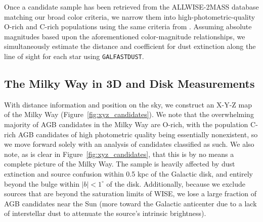 Once a candidate sample has been retrieved from the ALLWISE-2MASS database matching our broad color criteria, we narrow them into high-photometric-quality O-rich and C-rich populations using the same criteria from \cite{2014MNRAS.442.3361N}. Assuming absolute magnitudes based upon the aforementioned color-magnitude relationships, we simultaneously estimate the distance and coefficient for dust extinction along the line of sight for each star using {\tt GALFASTDUST}.

\subsection{The Milky Way in 3D and Disk Measurements}
With distance information and position on the sky, we construct an X-Y-Z map of the Milky Way (Figure~\ref{fig:xyz_candidates}). We note that the overwhelming majority of AGB candidates in the Milky Way are O-rich, with the population C-rich AGB candidates of high photometric quality being essentially nonexistent, so we move forward solely with an analysis of candidates classified as such. We also note, as is clear in Figure~\ref{fig:xyz_candidates}, that this is by no means a complete picture of the Milky Way. The sample is heavily affected by dust extinction and source confusion within 0.5 kpc of the Galactic disk, and entirely beyond the bulge within $|b| < 1^\circ$ of the disk. Additionally, because we exclude sources that are beyond the saturation limits of WISE, we lose a large fraction of AGB candidates near the Sun (more toward the Galactic anticenter due to a lack of interstellar dust to attenuate the source's intrinsic brightness).

